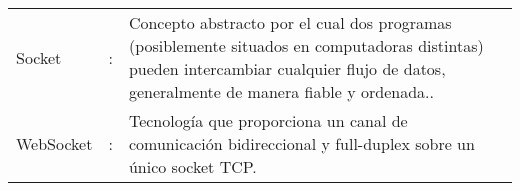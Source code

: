 \newpage
\begin{tabular}{lcp{10.5cm}}
Socket &:& Concepto abstracto por el cual dos programas (posiblemente situados en computadoras distintas) pueden intercambiar cualquier flujo de datos, generalmente de manera fiable y ordenada..\\

WebSocket &:& Tecnología que proporciona un canal de comunicación bidireccional y full-duplex sobre un único socket TCP.\\

\end{tabular}
